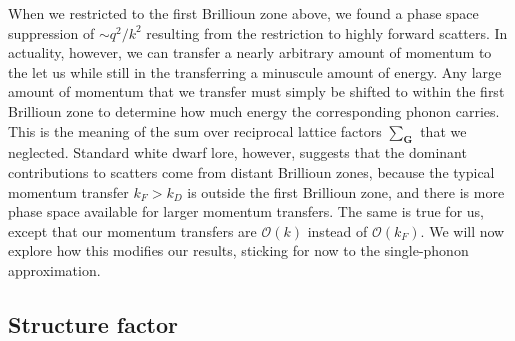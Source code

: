 \documentclass{article}
\newcommand{\OO}{\mathcal{O}}
\begin{document}
When we restricted to the first Brillioun zone above, we found a phase space suppression of $ \sim q^2 / k^2$ resulting from the restriction to highly forward scatters. In actuality, however, we can transfer a nearly arbitrary amount of momentum to the let us while still in the transferring a minuscule amount of energy. Any large amount of momentum that we transfer must simply be shifted to within the first Brillioun zone to determine how much energy the corresponding phonon carries. This is the meaning of the sum over reciprocal lattice factors $\sum_\textbf{G}$ that we neglected. Standard white dwarf lore, however, suggests that the dominant contributions to scatters come from distant Brillioun zones, because the typical momentum transfer $k_F > k_D$ is outside the first Brillioun zone, and there is more phase space available for larger momentum transfers. The same is true for us, except that our momentum transfers are $\OO(k)$ instead of $\OO(k_F)$. We will now explore how this modifies our results, sticking for now to the single-phonon approximation.

\subsection{Structure factor}
\end{document}
